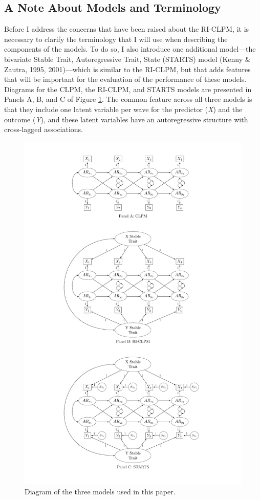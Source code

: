 \documentclass[
  english,
  man,floatsintext]{apa6}
\begin{document}
\hypertarget{a-note-about-models-and-terminology}{%
\subsection{A Note About Models and Terminology}\label{a-note-about-models-and-terminology}}

Before I address the concerns that have been raised about the RI-CLPM, it is necessary to clarify the terminology that I will use when describing the components of the models. To do so, I also introduce one additional model---the bivariate Stable Trait, Autoregressive Trait, State (STARTS) model (Kenny \& Zautra, 1995, 2001)---which is similar to the RI-CLPM, but that adds features that will be important for the evaluation of the performance of these models. Diagrams for the CLPM, the RI-CLPM, and STARTS models are presented in Panels A, B, and C of Figure \ref{fig:riclpmFig}. The common feature across all three models is that they include one latent variable per wave for the predictor (\emph{X}) and the outcome (\emph{Y}), and these latent variables have an autoregressive structure with cross-lagged associations.

\begin{figure}
\includegraphics[height=0.9\textheight]{images/comboFigure} \caption{Diagram of the three models used in this paper.}\label{fig:riclpmFig}
\end{figure}
\end{document}
